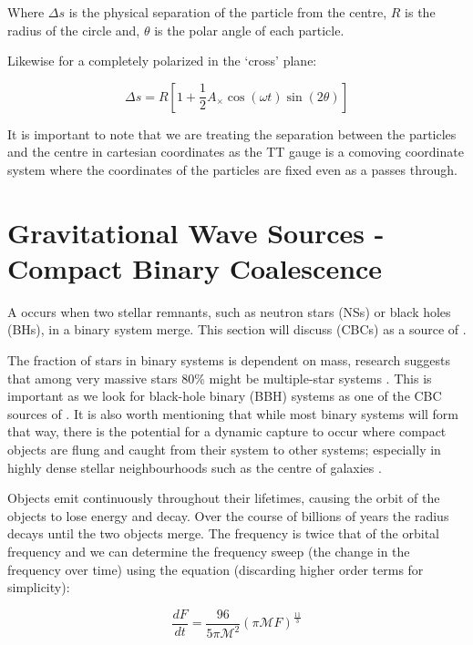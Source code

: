 Where $\Delta s$ is the physical separation of the particle from the centre, $R$ is the radius of the circle and, $\theta$ is the polar angle of each particle.

Likewise for a \gw completely polarized in the `cross' plane:

\begin{equation}
   \Delta s = R[1 + \frac{1}{2} A_{\times} \cos(\omega t) \sin(2 \theta)]
   \label{eqn:cross_separation}
\end{equation}

It is important to note that we are treating the separation between the particles and the centre in cartesian coordinates as the TT gauge is a comoving coordinate system where the coordinates of the particles are fixed
even as a \gw passes through.

\section{\label{sec:CBC}Gravitational Wave Sources - Compact Binary Coalescence}

A \cbc occurs when two stellar remnants, such as neutron stars (NSs) or black holes (BHs), in a binary system merge. This section will discuss \cbcs (CBCs) as a source of \gws.

The fraction of stars in binary systems is dependent on mass, research suggests that among very massive stars 80\% might be multiple-star systems \cite{binary_fraction:2006}. This is important as we look for black-hole binary (BBH) systems as one of the CBC sources of \gws. It is also worth mentioning that while most binary systems will form that way, there is the potential for a dynamic capture to occur where compact objects are flung and caught from
their system to other systems; especially in highly dense stellar neighbourhoods such as the centre of galaxies \cite{dynamic_capture:2000}.

Objects emit \gws continuously throughout their lifetimes, causing the orbit of the objects to lose energy and decay. Over the course of billions of years the radius decays until the two objects merge. The \gw frequency is twice that of the orbital frequency \cite{kip_book} and we can determine the frequency sweep (the change in the frequency over time) using the equation (discarding higher order terms for simplicity):

\begin{equation}
   \frac{dF}{dt} = \frac{96}{5 \pi \mathcal{M}^2} (\pi \mathcal{M} F)^{\frac{11}{3}}
   \label{eqn:frequency_sweep}
\end{equation}

